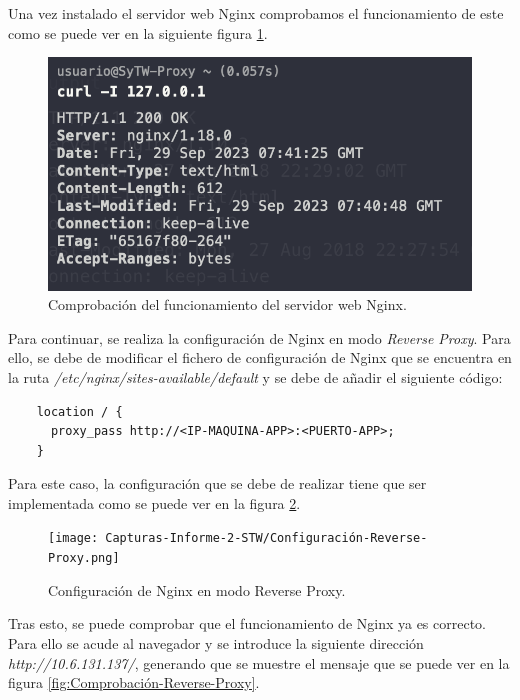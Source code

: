 \documentclass{report}
\begin{document}
  Una vez instalado el servidor web Nginx comprobamos el funcionamiento de este como se puede ver en la siguiente figura \ref{fig:Comprobación-Nginx}. 

  \begin{figure}[H]
    \centering
    \includegraphics[scale=0.6]{Capturas-Informe-2-STW/Image-1.png}
    \caption{Comprobación del funcionamiento del servidor web Nginx.}
    \label{fig:Comprobación-Nginx}
  \end{figure}

  Para continuar, se realiza la configuración de Nginx en modo \emph{Reverse Proxy}. Para ello, se debe de modificar el fichero de configuración de Nginx que se encuentra en la ruta \emph{/etc/nginx/sites-available/default} y se debe de añadir el siguiente código:

  \begin{verbatim}
    location / {
      proxy_pass http://<IP-MAQUINA-APP>:<PUERTO-APP>;
    }
  \end{verbatim}

  Para este caso, la configuración que se debe de realizar tiene que ser implementada como se puede ver en la figura \ref{fig:Configuración-Reverse-Proxy}.

  \begin{figure}[H]
    \centering
    \texttt{[image: Capturas-Informe-2-STW/Configuración-Reverse-Proxy.png]}
    \caption{Configuración de Nginx en modo Reverse Proxy.}
    \label{fig:Configuración-Reverse-Proxy}
  \end{figure}

  Tras esto, se puede comprobar que el funcionamiento de Nginx ya es correcto. Para ello se acude al navegador y se introduce la siguiente dirección \emph{http://10.6.131.137/}, generando que se muestre el mensaje que se puede ver en la figura \ref{fig:Comprobación-Reverse-Proxy}.
\end{document}
